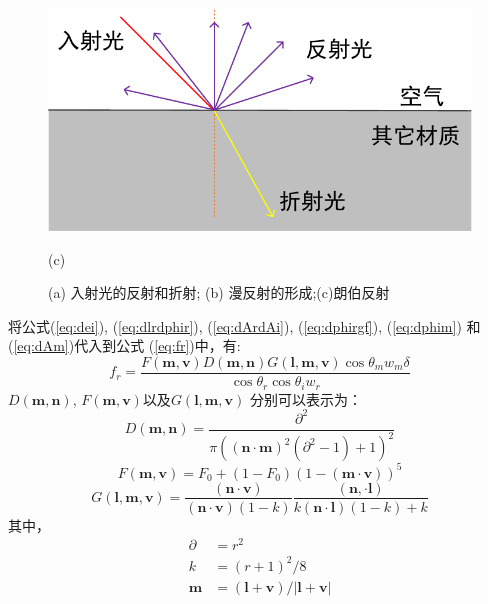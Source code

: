 \begin{figure}[!t]
  \begin{minipage}{0.45\linewidth}
    \centerline{\includegraphics[width=\textwidth]{FIG/reflect process3.pdf}}
    \centerline{(c)}
  \end{minipage}
  \vfill
  \caption{(a) 入射光的反射和折射; (b) 漫反射的形成;(c)朗伯反射}
  \label{fig:Reflection and refraction}
\end{figure}

将公式(\ref{eq:dei}), (\ref{eq:dlrdphir}), (\ref{eq:dArdAi}), (\ref{eq:dphirgf}), (\ref{eq:dphim}) 和 (\ref{eq:dAm})代入到公式 (\ref{eq:fr})中，有:
\begin{equation}\label{eq:frfdg0}
f_{r}=\frac{F(\mathbf{m},\mathbf{v})D(\mathbf{m},\mathbf{n})G(\mathbf{l},\mathbf{m},\mathbf{v})\cos\theta_{m}w_{m}\delta}{\cos\theta_{r}\cos\theta_{i}w_{r}}
\end{equation}
$D(\mathbf{m},\mathbf{n})$, $F(\mathbf{m},\mathbf{v})$以及$G(\mathbf{l},\mathbf{m},\mathbf{v})$ 分别可以表示为：
\begin{equation}\label{eq:Dm}
  D(\mathbf{m},\mathbf{n})=\frac{\partial^{2}}{\pi((\mathbf{n}\cdot\mathbf{m})^{2}(\partial^{2}-1)+1)^{2}}
\end{equation}
\begin{equation}\label{eq:Fm}
  F(\mathbf{m},\mathbf{v})=F_{0}+(1-F_{0})(1-(\mathbf{m}\cdot\mathbf{v}))^{5}
\end{equation}
\begin{equation}\label{eq:Glmv}
  G(\mathbf{l},\mathbf{m},\mathbf{v})=\frac{(\mathbf{n}\cdot\mathbf{v})}{(\mathbf{n}\cdot\mathbf{v})(1-k)}\frac{(\mathbf{n},\cdot\mathbf{l})}{k(\mathbf{n}\cdot\mathbf{l})(1-k)+k}
\end{equation}
其中，
\begin{subequations}\label{eq:akm}
  \begin{align}
  \partial&=r^{2} \label{eq:akmA}\\
  k&=(r+1)^{2}/8 \label{eq:akmB}\\
  \mathbf{m}&= (\mathbf{l}+\mathbf{v})/\left |\mathbf{l}+\mathbf{v}   \right | \label{eq:akmc}
  \end{align}
\end{subequations}
  
